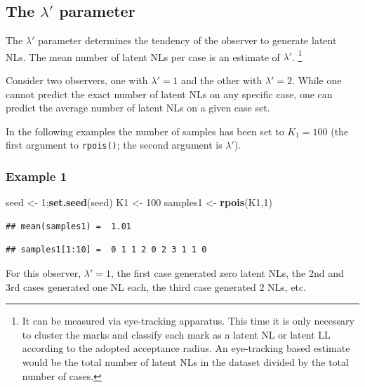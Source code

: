 \documentclass[
]{book}
\newenvironment{Shaded}{\begin{snugshade}}{\end{snugshade}}
\newcommand{\DecValTok}[1]{\textcolor[rgb]{0.00,0.00,0.81}{#1}}
\newcommand{\KeywordTok}[1]{\textcolor[rgb]{0.13,0.29,0.53}{\textbf{#1}}}
\newcommand{\NormalTok}[1]{#1}
\newcommand{\StringTok}[1]{\textcolor[rgb]{0.31,0.60,0.02}{#1}}
\begin{document}
\hypertarget{rsm-summary-lambda-prime-parameter}{%
\subsection{\texorpdfstring{The \(\lambda'\) parameter}{The \textbackslash lambda' parameter}}\label{rsm-summary-lambda-prime-parameter}}

The \(\lambda'\) parameter determines the tendency of the observer to generate latent NLs. The mean number of latent NLs per case is an estimate of \(\lambda'\). \footnote{It can be measured via eye-tracking apparatus. This time it is only necessary to cluster the marks and classify each mark as a latent NL or latent LL according to the adopted acceptance radius. An eye-tracking based estimate would be the total number of latent NLs in the dataset divided by the total number of cases.}

Consider two observers, one with \(\lambda' = 1\) and the other with \(\lambda' = 2\). While one cannot predict the exact number of latent NLs on any specific case, one can predict the average number of latent NLs on a given case set.

In the following examples the number of samples has been set to \(K_1=100\) (the first argument to \texttt{rpois()}; the second argument is \(\lambda'\)).

\hypertarget{example-1}{%
\subsubsection{Example 1}\label{example-1}}

\begin{Shaded}
\begin{Highlighting}[]
\NormalTok{seed <-}\StringTok{ }\DecValTok{1}\NormalTok{;}\KeywordTok{set.seed}\NormalTok{(seed)}
\NormalTok{K1 <-}\StringTok{ }\DecValTok{100}
\NormalTok{samples1 <-}\StringTok{ }\KeywordTok{rpois}\NormalTok{(K1,}\DecValTok{1}\NormalTok{)}
\end{Highlighting}
\end{Shaded}

\begin{verbatim}
## mean(samples1) =  1.01
\end{verbatim}

\begin{verbatim}
## samples1[1:10] =  0 1 1 2 0 2 3 1 1 0
\end{verbatim}

For this observer, \(\lambda' = 1\), the first case generated zero latent NLs, the 2nd and 3rd cases generated one NL each, the third case generated 2 NLs, etc.
\end{document}
